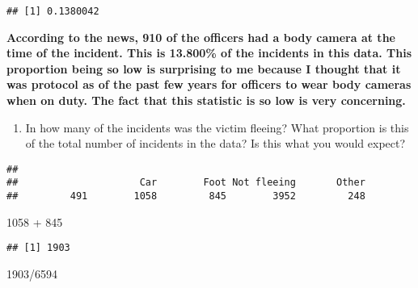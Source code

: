 \documentclass[
]{article}
\newenvironment{Shaded}{\begin{snugshade}}{\end{snugshade}}
\newcommand{\CommentTok}[1]{\textcolor[rgb]{0.56,0.35,0.01}{\textit{#1}}}
\newcommand{\DecValTok}[1]{\textcolor[rgb]{0.00,0.00,0.81}{#1}}
\newcommand{\FunctionTok}[1]{\textcolor[rgb]{0.00,0.00,0.00}{#1}}
\newcommand{\NormalTok}[1]{#1}
\newcommand{\SpecialCharTok}[1]{\textcolor[rgb]{0.00,0.00,0.00}{#1}}
\providecommand{\tightlist}{%
  \setlength{\itemsep}{0pt}\setlength{\parskip}{0pt}}
\begin{document}
\begin{verbatim}
## [1] 0.1380042
\end{verbatim}

\begin{Shaded}
\end{Shaded}

\textbf{According to the news, 910 of the officers had a body camera at
the time of the incident. This is 13.800\% of the incidents in this
data. This proportion being so low is surprising to me because I thought
that it was protocol as of the past few years for officers to wear body
cameras when on duty. The fact that this statistic is so low is very
concerning.}

\begin{enumerate}
\def\labelenumi{\alph{enumi}.}
\setcounter{enumi}{1}
\tightlist
\item
  In how many of the incidents was the victim fleeing? What proportion
  is this of the total number of incidents in the data? Is this what you
  would expect?
\end{enumerate}

\begin{Shaded}
\end{Shaded}

\begin{verbatim}
## 
##                     Car        Foot Not fleeing       Other 
##         491        1058         845        3952         248
\end{verbatim}

\begin{Shaded}
\begin{Highlighting}[]
\DecValTok{1058} \SpecialCharTok{+} \DecValTok{845}
\end{Highlighting}
\end{Shaded}

\begin{verbatim}
## [1] 1903
\end{verbatim}

\begin{Shaded}
\begin{Highlighting}[]
\DecValTok{1903}\SpecialCharTok{/}\DecValTok{6594}
\end{Highlighting}
\end{Shaded}
\end{document}
